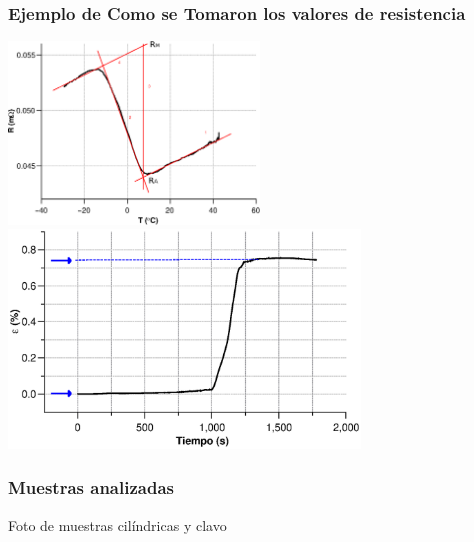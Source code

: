 \documentclass[usenames,dvipsnames]{beamer}
\begin{document}
\begin{frame}
\frametitle{Ejemplo de Como se Tomaron los valores de resistencia}
        \includegraphics[width=0.5\textwidth]{img/resistencia/ExpRes.eps}
        \includegraphics[width=0.7\textwidth]{img/resistencia/ExpStrain.eps}
\end{frame}



\begin{frame}
\frametitle{Muestras analizadas}
 Foto de muestras cilíndricas y clavo
\end{frame}


\end{document}
